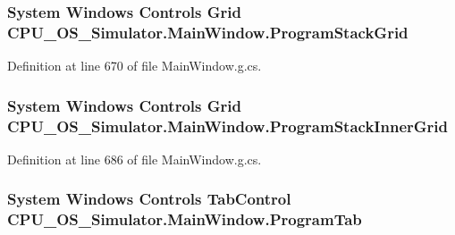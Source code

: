 \subsubsection[{Program\+Stack\+Grid}]{\setlength{\rightskip}{0pt plus 5cm}System Windows Controls Grid C\+P\+U\+\_\+\+O\+S\+\_\+\+Simulator.\+Main\+Window.\+Program\+Stack\+Grid\hspace{0.3cm}{\ttfamily [package]}}\label{class_c_p_u___o_s___simulator_1_1_main_window_a59373e8f8822e4efea670d9fb87a1b32}


Definition at line 670 of file Main\+Window.\+g.\+cs.

\hypertarget{class_c_p_u___o_s___simulator_1_1_main_window_a8c373866c86f6be0e7ef487a5ccb8c3c}{}
\subsubsection[{Program\+Stack\+Inner\+Grid}]{\setlength{\rightskip}{0pt plus 5cm}System Windows Controls Grid C\+P\+U\+\_\+\+O\+S\+\_\+\+Simulator.\+Main\+Window.\+Program\+Stack\+Inner\+Grid\hspace{0.3cm}{\ttfamily [package]}}\label{class_c_p_u___o_s___simulator_1_1_main_window_a8c373866c86f6be0e7ef487a5ccb8c3c}


Definition at line 686 of file Main\+Window.\+g.\+cs.

\hypertarget{class_c_p_u___o_s___simulator_1_1_main_window_a615ea960969aa9a61afdaef8cf039348}{}
\subsubsection[{Program\+Tab}]{\setlength{\rightskip}{0pt plus 5cm}System Windows Controls Tab\+Control C\+P\+U\+\_\+\+O\+S\+\_\+\+Simulator.\+Main\+Window.\+Program\+Tab\hspace{0.3cm}{\ttfamily [package]}}\label{class_c_p_u___o_s___simulator_1_1_main_window_a615ea960969aa9a61afdaef8cf039348}



